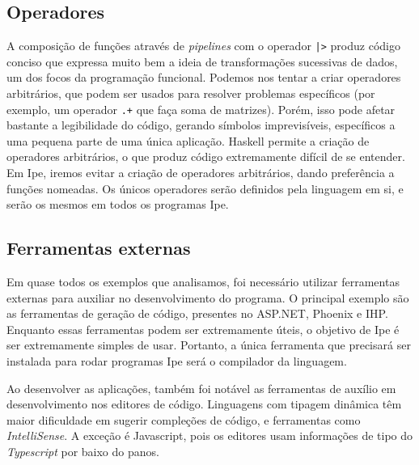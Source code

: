 \subsection{Operadores}

A composição de funções através de \textit{pipelines} com o operador
\texttt{|>} produz código conciso que expressa muito bem a ideia de transformações
sucessivas de dados, um dos focos da programação funcional. Podemos nos tentar
a criar operadores arbitrários, que podem ser usados para resolver problemas
específicos (por exemplo, um operador \texttt{.+} que faça soma de matrizes).
Porém, isso pode afetar bastante a legibilidade do código, gerando símbolos
imprevisíveis, específicos a uma pequena parte de uma única aplicação. Haskell
permite a criação de operadores arbitrários, o que produz código extremamente
difícil de se entender. Em Ipe, iremos evitar a criação de operadores arbitrários,
dando preferência a funções nomeadas. Os únicos operadores serão definidos pela
linguagem em si, e serão os mesmos em todos os programas Ipe.

\subsection{Ferramentas externas}

Em quase todos os exemplos que analisamos, foi necessário utilizar ferramentas
externas para auxiliar no desenvolvimento do programa. O principal exemplo são
as ferramentas de geração de código, presentes no ASP.NET, Phoenix e IHP. Enquanto
essas ferramentas podem ser extremamente úteis, o objetivo de Ipe é ser extremamente
simples de usar. Portanto, a única ferramenta que precisará ser instalada para
rodar programas Ipe será o compilador da linguagem.

Ao desenvolver as aplicações, também foi notável as ferramentas de auxílio em
desenvolvimento nos editores de código. Linguagens com tipagem dinâmica têm maior
dificuldade em sugerir compleções de código, e ferramentas como \textit{IntelliSense}.
A exceção é Javascript, pois os editores usam informações de tipo do \textit{Typescript}
por baixo do panos.
